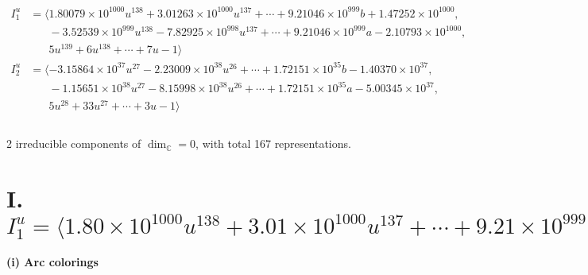 \documentclass[1p]{elsarticle_modified}
\theoremstyle{definition}
\begin{document}
\begin{align*}
I^u_{1}&=\langle 
1.80079\times10^{1000} u^{138}+3.01263\times10^{1000} u^{137}+\cdots+9.21046\times10^{999} b+1.47252\times10^{1000},\\
\phantom{I^u_{1}}&\phantom{= \langle  }-3.52539\times10^{999} u^{138}-7.82925\times10^{998} u^{137}+\cdots+9.21046\times10^{999} a-2.10793\times10^{1000},\\
\phantom{I^u_{1}}&\phantom{= \langle  }5 u^{139}+6 u^{138}+\cdots+7 u-1\rangle \\
I^u_{2}&=\langle 
-3.15864\times10^{37} u^{27}-2.23009\times10^{38} u^{26}+\cdots+1.72151\times10^{35} b-1.40370\times10^{37},\\
\phantom{I^u_{2}}&\phantom{= \langle  }-1.15651\times10^{38} u^{27}-8.15998\times10^{38} u^{26}+\cdots+1.72151\times10^{35} a-5.00345\times10^{37},\\
\phantom{I^u_{2}}&\phantom{= \langle  }5 u^{28}+33 u^{27}+\cdots+3 u-1\rangle \\
\\
\end{align*}
\raggedright * 2 irreducible components of $\dim_{\mathbb{C}}=0$, with total 167 representations.\\
\newpage
\renewcommand{\arraystretch}{1}
\centering \section*{I. $I^u_{1}= \langle 1.80\times10^{1000} u^{138}+3.01\times10^{1000} u^{137}+\cdots+9.21\times10^{999} b+1.47\times10^{1000},\;-3.53\times10^{999} u^{138}-7.83\times10^{998} u^{137}+\cdots+9.21\times10^{999} a-2.11\times10^{1000},\;5 u^{139}+6 u^{138}+\cdots+7 u-1 \rangle$}
\flushleft \textbf{(i) Arc colorings}\\
\end{document}
